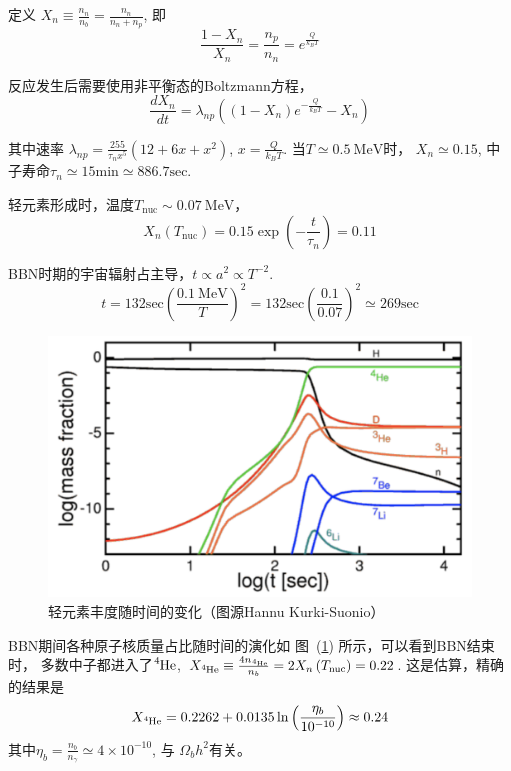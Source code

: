 \documentclass[12pt]{ctexart}
\newcommand{\reffig}[1]{图~(\ref{#1})}
\begin{document}
定义
$X_n\equiv \frac{n_n}{n_b} = \frac{n_n}{n_n+n_p}$,
即
\begin{equation}
    \frac{1-X_n}{X_n} = \frac{n_p}{n_n} = e^\frac{Q}{k_B T}
\end{equation}

反应发生后需要使用非平衡态的Boltzmann方程，
\begin{equation}
    \frac{dX_n}{dt} = \lambda_{np} \left( \left(1-X_n\right) e^{-\frac{Q }{k_B T}}-X_n\right) 
\end{equation}

其中速率 $\lambda_{np} = \frac{255}{\tau_n x^5} \left(12+6x+x^2\right) $,  
$x=\frac{Q}{k_B T}$.
当$T\simeq 0.5 \mathrm{~MeV}$时，
$X_n \simeq 0.15$,
中子寿命$\tau_n \simeq 15\mathrm{min} \simeq 886.7 \mathrm{sec}$.

轻元素形成时，温度$T_\text{nuc}\sim 0.07 \mathrm{~MeV}$， 
\begin{equation}
    X_n\left(T_\text{nuc}\right) = 0.15 \exp\left(-\frac{t }{\tau_n}\right) =0.11
\end{equation}

BBN时期的宇宙辐射占主导，$t\propto a^2\propto T^{-2}$.
\begin{equation}
    t = 132 \mathrm{sec} \left(\frac{0.1 \mathrm{~MeV}}{T}\right)^2 =   132 \mathrm{sec} \left(\frac{0.1 }{0.07}\right)^2 \simeq 269 \mathrm{sec}
\end{equation}

\begin{figure}[!hbtp]
	\centering
	\includegraphics[width=1.0\linewidth]{BBNt.png}
	\caption{轻元素丰度随时间的变化（图源Hannu Kurki-Suonio）} \label{fig:BBNt}
\end{figure}

BBN期间各种原子核质量占比随时间的演化如 \reffig{fig:BBNt}   所示，可以看到BBN结束时，
多数中子都进入了$\ce{^{4}He} $, $X_{\ce{^{4}He} } \equiv \frac{4 n_{\ce{^{4}He} }}{n_b} = 2X_n\left(T_\text{nuc}\right) =0.22$.
这是估算，精确的结果是
\begin{equation}
    X_{\ce{^{4}He} } = 0.2262+0.0135 \ln \left( \frac{\eta_b}{10^{-10}}\right) \approx 0.24
\end{equation}
其中$\eta_b = \frac{n_b}{n_\gamma} \simeq 4\times 10^{-10}$, 与 $\Omega_b h^2$有关。
\end{document}
